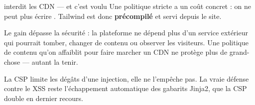 \begin{piege}{ interdit les CDN --- et c'est voulu}
Une politique stricte a un coût concret : on ne peut plus écrire
. Tailwind est donc
\textbf{précompilé} et servi depuis le site.

Le gain dépasse la sécurité : la plateforme ne dépend plus d'un service
extérieur qui pourrait tomber, changer de contenu ou observer les visiteurs.
Une politique de contenu qu'on affaiblit pour faire marcher un CDN ne protège
plus de grand-chose --- autant la tenir.
\end{piege}

\limite
La CSP limite les dégâts d'une injection, elle ne l'empêche pas. La vraie
défense contre le XSS reste l'échappement automatique des gabarits Jinja2, que
la CSP double en dernier recours.
